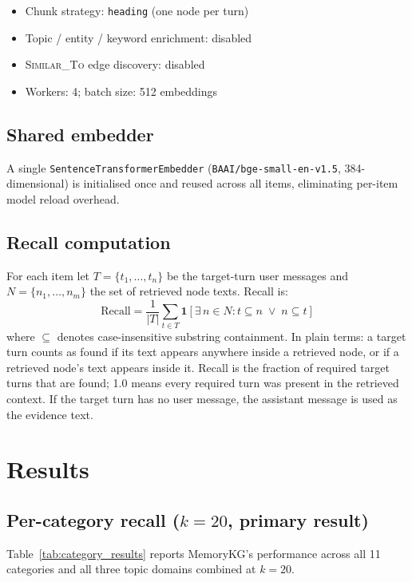 \documentclass[11pt,a4paper]{article}
\begin{document}
\begin{itemize}
  \item Chunk strategy: \texttt{heading} (one node per turn)
  \item Topic / entity / keyword enrichment: disabled
  \item \textsc{Similar\_To} edge discovery: disabled
  \item Workers: 4; batch size: 512 embeddings
\end{itemize}

\subsection{Shared embedder}

A single \texttt{SentenceTransformerEmbedder}
(\texttt{BAAI/bge-small-en-v1.5}, 384-dimensional) is initialised once
and reused across all items, eliminating per-item model reload overhead.

\subsection{Recall computation}

For each item let $T = \{t_1,\ldots,t_n\}$ be the target-turn user messages
and $N = \{n_1,\ldots,n_m\}$ the set of retrieved node texts.
Recall is:
\[
  \text{Recall} = \frac{1}{|T|}
    \sum_{t \in T} \mathbf{1}\!\left[\exists\, n \in N :
      t \subseteq n \;\vee\; n \subseteq t
    \right]
\]
where $\subseteq$ denotes case-insensitive substring containment.
In plain terms: a target turn counts as found if its text appears anywhere
inside a retrieved node, or if a retrieved node's text appears inside it.
Recall is the fraction of required target turns that are found; 1.0 means
every required turn was present in the retrieved context.
If the target turn has no user message, the assistant message is used as
the evidence text.

\section{Results}
\label{sec:results}

\subsection{Per-category recall ($k{=}20$, primary result)}

Table~\ref{tab:category_results} reports MemoryKG's performance across
all 11 categories and all three topic domains combined at $k{=}20$.
\end{document}
